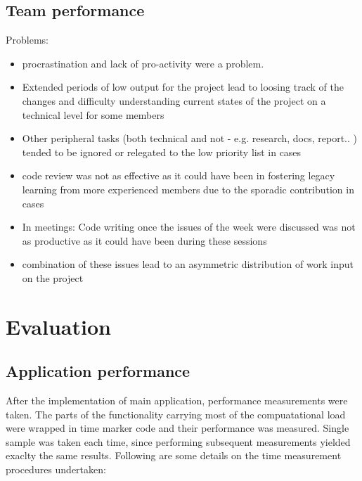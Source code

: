 \subsection{Team performance}
Problems:
\begin{itemize}
    \item procrastination and lack of pro-activity were a problem.
    \item Extended periods of low output for the project lead to loosing track of the changes and difficulty understanding current states of the project on a technical level for some members
    \item Other peripheral tasks (both technical and not - e.g. research, docs, report.. ) tended to be ignored or relegated to the low priority list in cases
    \item code review was not as effective as it could have been in fostering legacy learning from more experienced members due to the sporadic contribution in cases
    \item In meetings: Code writing once the issues of the week were discussed was not as productive as it could have been during these sessions
    \item combination of these issues lead to an asymmetric distribution of work input on the project
\end{itemize}


\section{Evaluation}
\subsection{Application performance}
After the implementation of main application, performance measurements were taken. The parts of the functionality carrying most of the compuatational load were wrapped in time marker code and their performance was measured. Single sample was taken each time, since performing subsequent measurements yielded exaclty the same results. Following are some details on the time measurement procedures undertaken:

